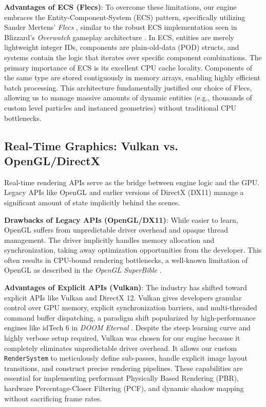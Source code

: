 \documentclass[acmtog, nonacm]{acmart}
\begin{document}
\textbf{Advantages of ECS (Flecs)}: To overcome these limitations, our engine embraces the Entity-Component-System (ECS) pattern, specifically utilizing Sander Mertens' \textit{Flecs} \cite{Flecs}, similar to the robust ECS implementation seen in Blizzard's \textit{Overwatch} gameplay architecture \cite{OverwatchECS}. In ECS, entities are merely lightweight integer IDs, components are plain-old-data (POD) structs, and systems contain the logic that iterates over specific component combinations. The primary importance of ECS is its excellent CPU cache locality. Components of the same type are stored contiguously in memory arrays, enabling highly efficient batch processing. This architecture fundamentally justified our choice of Flecs, allowing us to manage massive amounts of dynamic entities (e.g., thousands of custom level particles and instanced geometries) without traditional CPU bottlenecks.

\subsection{Real-Time Graphics: Vulkan vs. OpenGL/DirectX}
Real-time rendering APIs serve as the bridge between engine logic and the GPU. Legacy APIs like OpenGL and earlier versions of DirectX (DX11) manage a significant amount of state implicitly behind the scenes.

\textbf{Drawbacks of Legacy APIs (OpenGL/DX11)}: While easier to learn, OpenGL suffers from unpredictable driver overhead and opaque thread management. The driver implicitly handles memory allocation and synchronization, taking away optimization opportunities from the developer. This often results in CPU-bound rendering bottlenecks, a well-known limitation of OpenGL as described in the \textit{OpenGL SuperBible} \cite{OpenGLSuperBible}.

\textbf{Advantages of Explicit APIs (Vulkan)}: The industry has shifted toward explicit APIs like Vulkan and DirectX 12. Vulkan gives developers granular control over GPU memory, explicit synchronization barriers, and multi-threaded command buffer dispatching, a paradigm shift popularized by high-performance engines like idTech 6 in \textit{DOOM Eternal} \cite{DoomEternal, DoomVulkan}. Despite the steep learning curve and highly verbose setup required, Vulkan was chosen for our engine because it completely eliminates unpredictable driver overhead. It allows our custom \texttt{RenderSystem} to meticulously define sub-passes, handle explicit image layout transitions, and construct precise rendering pipelines. These capabilities are essential for implementing performant Physically Based Rendering (PBR), hardware Percentage-Closer Filtering (PCF), and dynamic shadow mapping without sacrificing frame rates.
\end{document}
